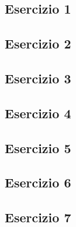 \vspace{0.8cm}
\subsection{\textbf{Esercizio 1}}

\newpage
\subsection{\textbf{Esercizio 2}}

\newpage
\subsection{\textbf{Esercizio 3}}

\newpage
\subsection{\textbf{Esercizio 4}}

\newpage
\subsection{\textbf{Esercizio 5}}

\newpage
\subsection{\textbf{Esercizio 6}}

\newpage
\subsection{\textbf{Esercizio 7}}

\newpage
